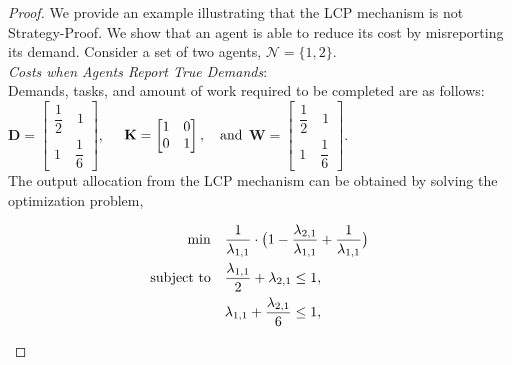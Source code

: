 \documentclass[letterpaper]{article} %
\theoremstyle{definition}
\begin{document}
\begin{proof}
We provide an example illustrating that the LCP mechanism is not Strategy-Proof. We show that an agent is able to reduce its cost by misreporting its demand. Consider a set of two agents, $\mathcal{N} = \{1, 2\}$.\\

\noindent \textit{Costs when Agents Report True Demands}:\\
\noindent Demands, tasks, and amount of work required to be completed are as follows:\\
$\mathbf{D} = \begin{bmatrix} \dfrac{1}{2} \quad 1 \\1 \quad \dfrac{1}{6} \end{bmatrix}, \quad$
$\mathbf{K} = \begin{bmatrix} 1 \quad 0 \\0 \quad 1 \end{bmatrix}, \quad \textnormal{and}$
$\mathbf{W} = \begin{bmatrix} \dfrac{1}{2} \quad 1 \\1 \quad \dfrac{1}{6} \end{bmatrix}$.\\[2 pt]

\noindent The output allocation from the LCP mechanism can be obtained by solving the optimization problem,
\begin{linenomath}
\begin{align*}
\min  \quad  &  \dfrac{1}{\lambda_{1,1}}\cdot \big( 1 - \dfrac{\lambda_{2,1}}{\lambda_{1,1}} + \dfrac{1}{\lambda_{1,1}}  \big) 
\\ \textnormal{subject to} \quad  & \dfrac{\lambda_{1,1}}{2} + \lambda_{2,1} \leq 1, 
\\\quad & \lambda_{1,1} + \dfrac{\lambda_{2,1}}{6} \leq 1,
\end{align*}
\end{linenomath}


\end{proof}
\end{document}
